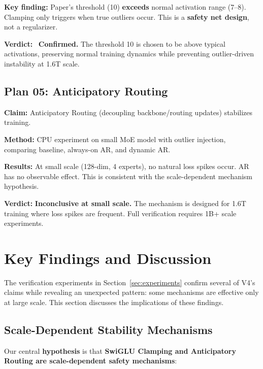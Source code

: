 \documentclass[11pt,a4paper]{article}
\begin{document}
\textbf{Key finding:} Paper's threshold (10) \textbf{exceeds} normal activation range (7--8). Clamping only triggers when true outliers occur. This is a \textbf{safety net design}, not a regularizer.

\textbf{Verdict:} \checkmark\ \textbf{Confirmed.} The threshold 10 is chosen to be above typical activations, preserving normal training dynamics while preventing outlier-driven instability at 1.6T scale.

\subsection{Plan 05: Anticipatory Routing}

\textbf{Claim:} Anticipatory Routing (decoupling backbone/routing updates) stabilizes training.

\textbf{Method:} CPU experiment on small MoE model with outlier injection, comparing baseline, always-on AR, and dynamic AR.

\textbf{Results:} At small scale (128-dim, 4 experts), no natural loss spikes occur. AR has no observable effect. This is consistent with the scale-dependent mechanism hypothesis.

\textbf{Verdict:} \textbf{Inconclusive at small scale.} The mechanism is designed for 1.6T training where loss spikes are frequent. Full verification requires 1B+ scale experiments.

\section{Key Findings and Discussion}
\label{sec:discussion}

The verification experiments in Section~\ref{sec:experiments} confirm several of V4's claims while revealing an unexpected pattern: some mechanisms are effective only at large scale. This section discusses the implications of these findings.

\subsection{Scale-Dependent Stability Mechanisms}

Our central \textbf{hypothesis} is that \textbf{SwiGLU Clamping and Anticipatory Routing are scale-dependent safety mechanisms}:
\end{document}
